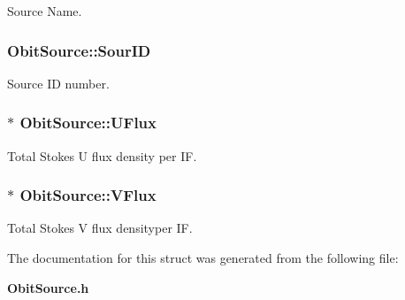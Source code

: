 Source Name. 

\subsubsection{ {\bf Obit\-Source::Sour\-ID}}\label{structObitSource_o4}


Source ID number. 

\subsubsection{$\ast$ {\bf Obit\-Source::UFlux}}\label{structObitSource_o18}


Total Stokes U flux density per IF. 

\subsubsection{$\ast$ {\bf Obit\-Source::VFlux}}\label{structObitSource_o19}


Total Stokes V flux densityper IF. 



The documentation for this struct was generated from the following file:\begin{CompactItemize}
\item 
{\bf Obit\-Source.h}\end{CompactItemize}
